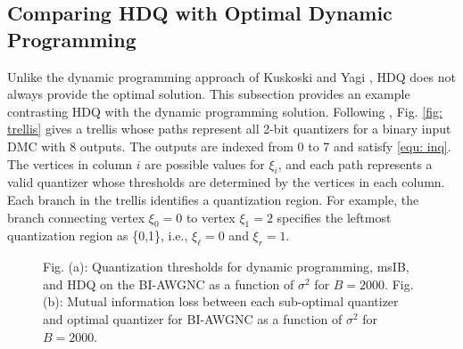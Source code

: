 \documentclass [PhD] {uclathes}
\begin{document}
\subsection{Comparing HDQ with Optimal Dynamic Programming}
Unlike the dynamic programming approach of Kuskoski and Yagi \cite{Kurkoski2014-QuanDMC}, HDQ does not always provide the optimal solution.  
This subsection provides an example contrasting HDQ with the dynamic programming solution. 
Following \cite{Kurkoski2014-QuanDMC}, Fig. \ref{fig: trellis} gives a trellis whose paths represent all 2-bit quantizers for a binary input DMC with 8 outputs. The outputs are indexed from 0 to 7 and satisfy \eqref{equ: inq}. The vertices in column $i$ are possible values for $\xi_i$, and each path represents a valid quantizer whose thresholds are determined by the vertices in each column. Each branch in the trellis identifies a quantization region. For example, the branch connecting vertex $\xi_0=0$ to vertex $\xi_1=2$ specifies the leftmost quantization region as \{0,1\}, i.e., $\xi_{\ell} = 0$ and $\xi_r =1$.
\begin{figure}[t] 
    \centering
    \hfill
  \caption{Fig. (a): Quantization thresholds for dynamic programming, msIB, and HDQ on the BI-AWGNC as a function of $\sigma^2$ for $B=2000$. Fig. (b): Mutual information loss between each sub-optimal quantizer and optimal quantizer for BI-AWGNC as a function of $\sigma^2$ for $B=2000$. }
\end{figure}
\end{document}
